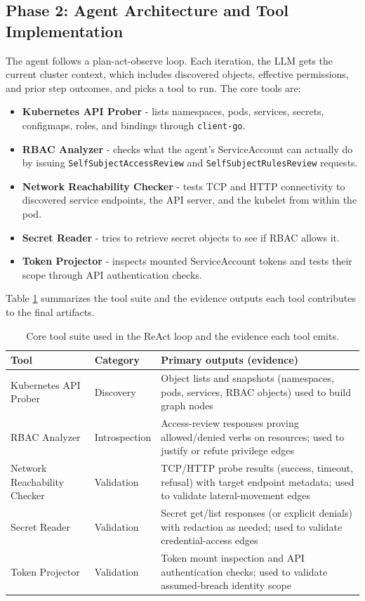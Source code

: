\documentclass[conference]{IEEEtran}
\begin{document}
\subsection{Phase 2: Agent Architecture and Tool Implementation}
The agent follows a plan-act-observe loop. Each iteration, the LLM gets the current cluster context, which includes discovered objects, effective permissions, and prior step outcomes, and picks a tool to run. The core tools are:
\begin{itemize}
    \item \textbf{Kubernetes API Prober} - lists namespaces, pods, services, secrets, configmaps, roles, and bindings through \texttt{client-go}.
    \item \textbf{RBAC Analyzer} - checks what the agent's ServiceAccount can actually do by issuing \texttt{SelfSubjectAccessReview} and \texttt{SelfSubjectRulesReview} requests.
    \item \textbf{Network Reachability Checker} - tests TCP and HTTP connectivity to discovered service endpoints, the API server, and the kubelet from within the pod.
    \item \textbf{Secret Reader} - tries to retrieve secret objects to see if RBAC allows it.
    \item \textbf{Token Projector} - inspects mounted ServiceAccount tokens and tests their scope through API authentication checks.
\end{itemize}

Table \ref{tab:tool_suite} summarizes the tool suite and the evidence outputs each tool contributes to the final artifacts.

\begin{table}[t!]
\centering
\caption{Core tool suite used in the ReAct loop and the evidence each tool emits.}
\label{tab:tool_suite}
\scriptsize
\setlength{\tabcolsep}{6pt}
\renewcommand{\arraystretch}{1.2}
\begin{tabularx}{\textwidth}{l l X}
\toprule
\textbf{Tool} & \textbf{Category} & \textbf{Primary outputs (evidence)} \\
\midrule
Kubernetes API Prober & Discovery & Object lists and snapshots (namespaces, pods, services, RBAC objects) used to build graph nodes \\
RBAC Analyzer & Introspection & Access-review responses proving allowed/denied verbs on resources; used to justify or refute privilege edges \\
Network Reachability Checker & Validation & TCP/HTTP probe results (success, timeout, refusal) with target endpoint metadata; used to validate lateral-movement edges \\
Secret Reader & Validation & Secret get/list responses (or explicit denials) with redaction as needed; used to validate credential-access edges \\
Token Projector & Validation & Token mount inspection and API authentication checks; used to validate assumed-breach identity scope \\
\bottomrule
\end{tabularx}
\end{table}
\end{document}
